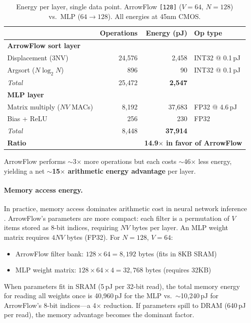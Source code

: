 \documentclass[12pt]{article}
\begin{document}
\begin{table}[ht]
\centering
\caption{Energy per layer, single data point. ArrowFlow \texttt{[128]} ($V{=}64$, $N{=}128$) vs.\ MLP ($64{\to}128$). All energies at 45nm CMOS.}
\label{tab:energy-layer}
\small
\begin{tabular}{lrrl}
\toprule
& Operations & Energy (pJ) & Op type \\
\midrule
\textbf{ArrowFlow sort layer} & & & \\
\quad Displacement (3NV) & 24,576  & 2,458 & INT32 @ 0.1\,pJ \\
\quad Argsort ($N\log_2 N$)& 896    & 90    & INT32 @ 0.1\,pJ \\
\quad \textit{Total} & 25,472  & \textbf{2,547} & \\
\midrule
\textbf{MLP layer} & & & \\
\quad Matrix multiply ($NV$ MACs) & 8,192 & 37,683 & FP32 @ 4.6\,pJ \\
\quad Bias + ReLU & 256 & 230 & FP32 \\
\quad \textit{Total} & 8,448 & \textbf{37,914} & \\
\midrule
\textbf{Ratio} & & \multicolumn{2}{l}{\textbf{14.9$\times$ in favor of ArrowFlow}} \\
\bottomrule
\end{tabular}
\end{table}

ArrowFlow performs $\sim$3$\times$ more operations but each costs $\sim$46$\times$ less energy, yielding a net \textbf{$\sim$15$\times$ arithmetic energy advantage} per layer.

\paragraph{Memory access energy.}
In practice, memory access dominates arithmetic cost in neural network inference \citep{sze2017efficient}. ArrowFlow's parameters are more compact: each filter is a permutation of $V$ items stored as 8-bit indices, requiring $NV$ bytes per layer. An MLP weight matrix requires $4NV$ bytes (FP32). For $N = 128$, $V = 64$:
\begin{itemize}[leftmargin=2em]
  \item ArrowFlow filter bank: $128 \times 64 = 8{,}192$ bytes (fits in 8KB SRAM)
  \item MLP weight matrix: $128 \times 64 \times 4 = 32{,}768$ bytes (requires 32KB)
\end{itemize}
When parameters fit in SRAM (5\,pJ per 32-bit read), the total memory energy for reading all weights once is 40,960\,pJ for the MLP vs.\ $\sim$10,240\,pJ for ArrowFlow's 8-bit indices---a 4$\times$ reduction. If parameters spill to DRAM (640\,pJ per read), the memory advantage becomes the dominant factor.
\end{document}
